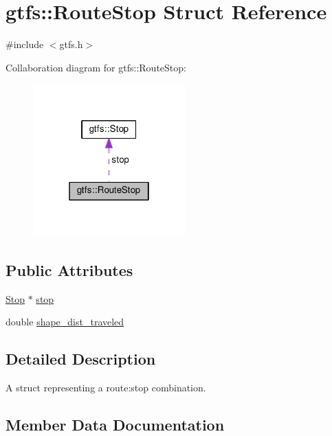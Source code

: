 \hypertarget{structgtfs_1_1RouteStop}{}\section{gtfs\+:\+:Route\+Stop Struct Reference}
\label{structgtfs_1_1RouteStop}


{\ttfamily \#include $<$gtfs.\+h$>$}



Collaboration diagram for gtfs\+:\+:Route\+Stop\+:\nopagebreak
\begin{figure}[H]
\begin{center}
\leavevmode
\includegraphics[width=166pt]{structgtfs_1_1RouteStop__coll__graph}
\end{center}
\end{figure}
\subsection*{Public Attributes}
\begin{DoxyCompactItemize}
\item 
\hyperlink{classgtfs_1_1Stop}{Stop} $\ast$ \hyperlink{structgtfs_1_1RouteStop_ae14c110356572344748f08c07fea1b0c}{stop}
\item 
double \hyperlink{structgtfs_1_1RouteStop_ab738c008a00eab17953ab124a86ca207}{shape\+\_\+dist\+\_\+traveled}
\end{DoxyCompactItemize}


\subsection{Detailed Description}
A struct representing a route\+:stop combination. 

\subsection{Member Data Documentation}
\mbox{\label{structgtfs_1_1RouteStop_ab738c008a00eab17953ab124a86ca207}} 
